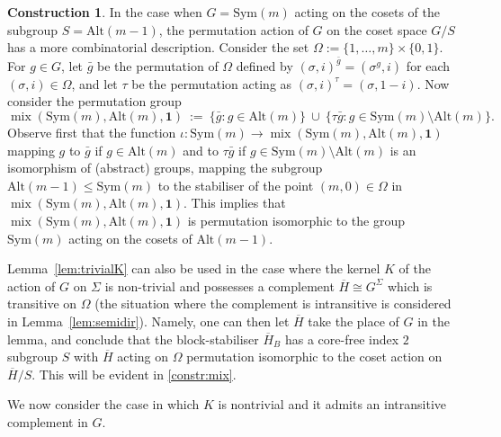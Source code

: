 \documentclass[a4paper]{amsart}
\newcommand{\Sym}{\mathrm{Sym}}
\newcommand{\Alt}{\mathrm{Alt}}
\newcommand{\mix}{\mathop{\mathrm{mix}}}
\newcommand{\one}{\mathbf{1}}
\theoremstyle{definition}
\newtheorem{remark}[theorem]{Remark}
\newtheorem{construction}[theorem]{Construction}
\begin{document}
\begin{construction}
\label{rem:cos}
In the case when $G= \Sym(m)$ acting on the cosets of the subgroup $S=\Alt(m-1)$,
the permutation action of $G$ on the coset space $G/S$ has a more combinatorial description. 
Consider the set $\Omega:=\{1,\ldots,m\} \times \{0,1\}$. For $g\in G$, let $\bar{g}$ be the permutation of $\Omega$ defined by $(\sigma,i)^{\bar{g}} = (\sigma^g, i)$ for each $(\sigma,i) \in \Omega$,
and let $\tau$ be the permutation acting as $(\sigma,i)^\tau=(\sigma,1-i)$. 
Now consider the permutation group 
$$\mix(\Sym(m),\Alt(m),\one) \> := \> \{\bar{g} : g \in \Alt(m)\}\> \cup\> \{\tau\bar{g} : g \in \Sym(m)\setminus \Alt(m)\}.$$
Observe first that the function $\iota \colon \Sym(m) \to \mix(\Sym(m),\Alt(m),\one)$ mapping $g$ to $\bar{g}$ if
$g\in \Alt(m)$ and to $\tau\bar{g}$ if $g\in \Sym(m)\setminus \Alt(m)$ is an isomorphism of (abstract) groups,
mapping the subgroup $\Alt(m-1)\le \Sym(m)$ to the stabiliser of the point $(m,0) \in \Omega$ in $\mix(\Sym(m),\Alt(m),\one)$. This implies
that $\mix(\Sym(m),\Alt(m),\one)$ is permutation isomorphic to the group $\Sym(m)$ acting on the cosets of $\Alt(m-1)$.
\end{construction}

Lemma~\ref{lem:trivialK} can also be used in the case where the kernel $K$ of the action of $G$ on $\Sigma$ is non-trivial and possesses
a complement $\overline{H} \cong G^\Sigma$ which is transitive on $\Omega$ (the situation where the complement is intransitive is considered in Lemma~\ref{lem:semidir}). Namely, one can then let $\overline{H}$ take the place of $G$ in the lemma, and conclude that the block-stabiliser $\overline{H}_B$ has a core-free index $2$ subgroup $S$ with $\overline{H}$ acting on $\Omega$ permutation isomorphic to the coset action on $\overline{H}/S$. This will be evident in \cref{constr:mix}. 

We now consider the case in which $K$ is nontrivial and it admits an intransitive complement in $G$.
\end{document}
